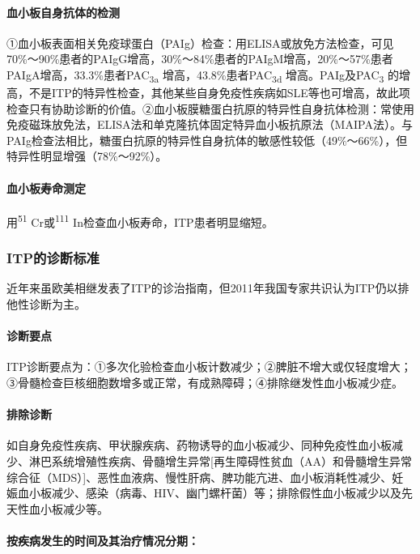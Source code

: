 \paragraph{血小板自身抗体的检测}

①血小板表面相关免疫球蛋白（PAIg）检查：用ELISA或放免方法检查，可见70\%～90\%患者的PAIgG增高，30\%～84\%患者的PAIgM增高，20\%～57\%患者PAIgA增高，33.3\%患者PAC\textsubscript{3a}
增高，43.8\%患者PAC\textsubscript{3d} 增高。PAIg及PAC\textsubscript{3}
的增高，不是ITP的特异性检查，其他某些自身免疫性疾病如SLE等也可增高，故此项检查只有协助诊断的价值。②血小板膜糖蛋白抗原的特异性自身抗体检测：常使用免疫磁珠放免法，ELISA法和单克隆抗体固定特异血小板抗原法（MAIPA法）。与PAIg检查法相比，糖蛋白抗原的特异性自身抗体的敏感性较低（49\%～66\%），但特异性明显增强（78\%～92\%）。

\paragraph{血小板寿命测定}

用\textsuperscript{51} Cr或\textsuperscript{111}
In检查血小板寿命，ITP患者明显缩短。

\subsubsection{ITP的诊断标准}

近年来虽欧美相继发表了ITP的诊治指南，但2011年我国专家共识认为ITP仍以排他性诊断为主。

\paragraph{诊断要点}

ITP诊断要点为：①多次化验检查血小板计数减少；②脾脏不增大或仅轻度增大；③骨髓检查巨核细胞数增多或正常，有成熟障碍；④排除继发性血小板减少症。

\paragraph{排除诊断}

如自身免疫性疾病、甲状腺疾病、药物诱导的血小板减少、同种免疫性血小板减少、淋巴系统增殖性疾病、骨髓增生异常{[}再生障碍性贫血（AA）和骨髓增生异常综合征（MDS）{]}、恶性血液病、慢性肝病、脾功能亢进、血小板消耗性减少、妊娠血小板减少、感染（病毒、HIV、幽门螺杆菌）等；排除假性血小板减少以及先天性血小板减少等。

\paragraph{按疾病发生的时间及其治疗情况分期：}

